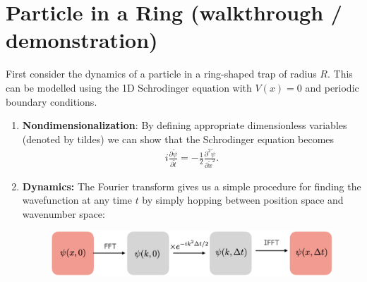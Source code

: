 \documentclass[11pt]{article}
\begin{document}
\section{Particle in a Ring (walkthrough / demonstration)}
First consider the dynamics of a particle in a ring-shaped trap of radius $R$. This can be modelled using the 1D Schrodinger equation with $V(x) = 0$ and periodic boundary conditions.
\begin{enumerate}

   

\item \textbf{Nondimensionalization}: By defining appropriate dimensionless variables (denoted by tildes) 
we can show that the  Schrodinger equation becomes
\begin{align}
i \frac{\partial \tilde \psi}{\partial  \tilde t} = - \frac{1}{2} \frac{\partial^2 \tilde \psi} {\partial \tilde x^2}.
\end{align} 

\item \textbf{Dynamics:} The Fourier transform gives us a simple procedure for finding the wavefunction at any time $t$ by simply hopping between position space and wavenumber space:
\begin{figure}[!h]
\centering
\hspace{1cm}\includegraphics[width= 0.6\columnwidth]{algorithm2.png}
\end{figure}


\end{enumerate}
\end{document}
